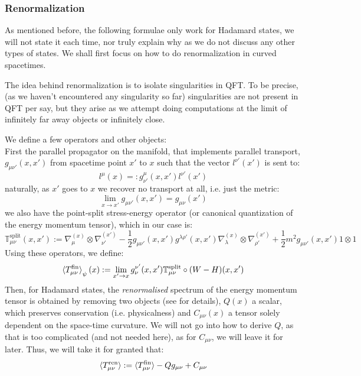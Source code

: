 \documentclass[a4paper,11pt]{article}
\numberwithin{equation}{section}
\theoremstyle{definition}
\begin{document}
\subsubsection{Renormalization}
    As mentioned before, the following formulae only work for Hadamard states, we will not state it each time, nor truly explain why as we do not discuss any other types of states. We shall first focus on how to do renormalization in curved spacetimes. 

    The idea behind renormalization is to isolate singularities in QFT. To be precise, (as we haven't encountered any singularity so far) singularities are not present in QFT per say, but they arise as we attempt doing computations at the limit of infinitely far away objects or infinitely close.

    We define a few operators and other objects:\\
    First the parallel propagator on the manifold, that implements parallel transport, $g_{\mu\nu'}(x,x')$ from spacetime point $x'$ to $x$ such that the vector $l^{\nu'}(x')$ is sent to:
    \begin{equation}
    l^{\mu}(x)=:g^\mu_{\nu'}(x,x')l^{\nu'}(x')
    \end{equation}
    naturally, as $x'$ goes to $x$ we recover no transport at all, i.e. just the metric:
    \begin{equation}
    \lim_{x\to x'} g_{\mu\nu'}(x,x')=g_{\mu\nu}(x')
    \end{equation}
    we also have the point-split stress-energy operator (or canonical quantization of the energy momentum tensor), which in our case is:
    \begin{equation}
    \mathbb{T}^\mathrm{split}_{\mu\nu}(x,x'):=\nabla^{(x)}_\mu\otimes\nabla^{(x')}_{\nu'}-\frac{1}{2}g_{\mu\nu'}(x,x')g^{\lambda\rho'}(x,x')\nabla_\lambda^{(x)}\otimes\nabla_{\rho'}^{(x')}+\frac{1}{2}m^2g_{\mu\nu'}(x,x')1\otimes 1
    \end{equation}
    Using these operators, we define:
    \begin{equation}
    \braket{T^\mathrm{fin}_{\mu\nu}}_\psi(x):=\lim_{x'\to x} g_\nu^{\nu'}(x,x')\mathbb{T}^\mathrm{split}_{\mu\nu}\circ(W-H)(x,x')
    \end{equation}
    Then, for Hadamard states, the \emph{renormalised} spectrum of the energy momentum tensor is obtained by removing two objects (see \cite{QCRenorm} for details), $Q(x)$ a scalar, which preserves conservation (i.e. physicalness) and $C_{\mu\nu}(x)$ a tensor solely dependent on the space-time curvature. We will not go into how to derive $Q$, as that is too complicated (and not needed here), as for $C_{\mu\nu}$, we will leave it for later. Thus, we will take it for granted that:
    \begin{equation}\label{T_ren}
    \braket{T^\mathrm{ren}_{\mu\nu}}:=\braket{T^\mathrm{fin}_{\mu\nu}}-Qg_{\mu\nu} + C_{\mu\nu}
    \end{equation}
    
\end{document}
